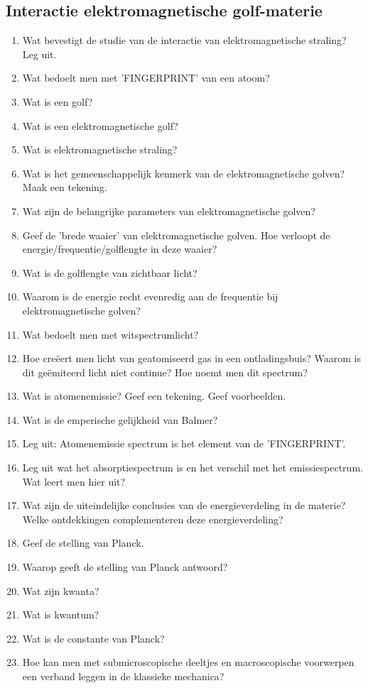 \documentclass[a4paper,12pt]{article}
\begin{document}
    \subsection*{Interactie elektromagnetische golf-materie}
    \begin{enumerate}
        \item Wat bevestigt de studie van de interactie van elektromagnetische straling? Leg uit.
        \item Wat bedoelt men met 'FINGERPRINT' van een atoom?
        \item Wat is een golf?
        \item Wat is een elektromagnetische golf?
        \item Wat is elektromagnetische straling?
        \item Wat is het gemeenschappelijk kenmerk van de elektromagnetische golven? Maak een tekening.
        \item Wat zijn de belangrijke parameters van elektromagnetische golven?
        \item Geef de 'brede waaier' van elektromagnetische golven. Hoe verloopt de energie/frequentie/golflengte in deze waaier?
        \item Wat is de golflengte van zichtbaar licht?
        \item Waarom is de energie recht evenredig aan de frequentie bij elektromagnetische golven?
        \item Wat bedoelt men met witspectrumlicht?
        \item Hoe creëert men licht van geatomiseerd gas in een ontladingsbuis? Waarom is dit geëmiteerd licht niet continue? Hoe noemt men dit spectrum?
        \item Wat is atomenemissie? Geef een tekening. Geef voorbeelden.
        \item Wat is de emperische gelijkheid van Balmer?
        \item Leg uit: Atomenemissie spectrum is het element van de 'FINGERPRINT'.
        \item Leg uit wat het absorptiespectrum is en het verschil met het emissiespectrum. Wat leert men hier uit?
        \item Wat zijn de uiteindelijke conclusies van de energieverdeling in de materie? Welke ontdekkingen complementeren deze energieverdeling?
        \item Geef de stelling van Planck.
        \item Waarop geeft de stelling van Planck antwoord?
        \item Wat zijn kwanta?
        \item Wat is kwantum?
        \item Wat is de constante van Planck?
        \item Hoe kan men met submicroscopische deeltjes en macroscopische voorwerpen een verband leggen in de klassieke mechanica?
    \end{enumerate}
\end{document}
